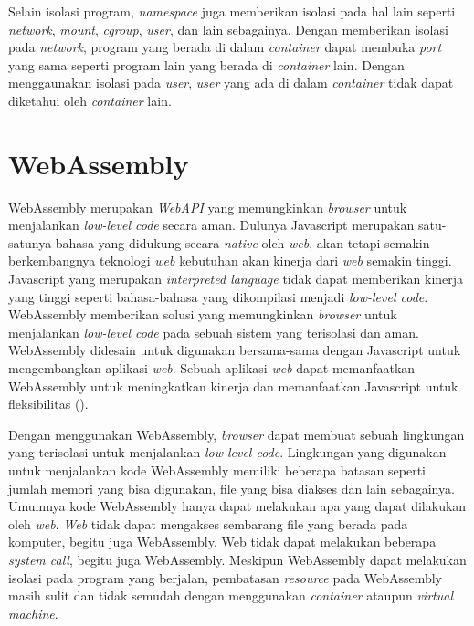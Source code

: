 \par Selain isolasi program, \textit{namespace} juga memberikan isolasi pada hal lain seperti \textit{network}, \textit{mount}, \textit{cgroup}, \textit{user}, dan lain sebagainya. Dengan memberikan isolasi pada \textit{network}, program yang berada di dalam \textit{container} dapat membuka \textit{port} yang sama seperti program lain yang berada di \textit{container} lain. Dengan menggaunakan isolasi pada \textit{user}, \textit{user} yang ada di dalam \textit{container} tidak dapat diketahui oleh \textit{container} lain.

\section{WebAssembly}

\par WebAssembly merupakan \textit{WebAPI} yang memungkinkan \textit{browser} untuk menjalankan \textit{low-level code} secara aman. Dulunya Javascript merupakan satu-satunya bahasa yang didukung secara \textit{native} oleh \textit{web}, akan tetapi semakin berkembangnya teknologi \textit{web} kebutuhan akan kinerja dari \textit{web} semakin tinggi. Javascript yang merupakan \textit{interpreted language} tidak dapat memberikan kinerja yang tinggi seperti bahasa-bahasa yang dikompilasi menjadi \textit{low-level code}. WebAssembly memberikan solusi yang memungkinkan \textit{browser} untuk menjalankan \textit{low-level code} pada sebuah sistem yang terisolasi dan aman. WebAssembly didesain untuk digunakan bersama-sama dengan Javascript untuk mengembangkan aplikasi \textit{web}. Sebuah aplikasi \textit{web} dapat memanfaatkan WebAssembly untuk meningkatkan kinerja dan memanfaatkan Javascript untuk fleksibilitas (\cite{mdnwebasm}).

\par Dengan menggunakan WebAssembly, \textit{browser} dapat membuat sebuah lingkungan yang terisolasi untuk menjalankan \textit{low-level code}. Lingkungan yang digunakan untuk menjalankan kode WebAssembly memiliki beberapa batasan seperti jumlah memori yang bisa digunakan, file yang bisa diakses dan lain sebagainya. Umumnya kode WebAssembly hanya dapat melakukan apa yang dapat dilakukan oleh \textit{web}. \textit{Web} tidak dapat mengakses sembarang file yang berada pada komputer, begitu juga WebAssembly. Web tidak dapat melakukan beberapa \textit{system call}, begitu juga WebAssembly. Meskipun WebAssembly dapat melakukan isolasi pada program yang berjalan, pembatasan \textit{resource} pada WebAssembly masih sulit dan tidak semudah dengan menggunakan \textit{container} ataupun \textit{virtual machine}. 

